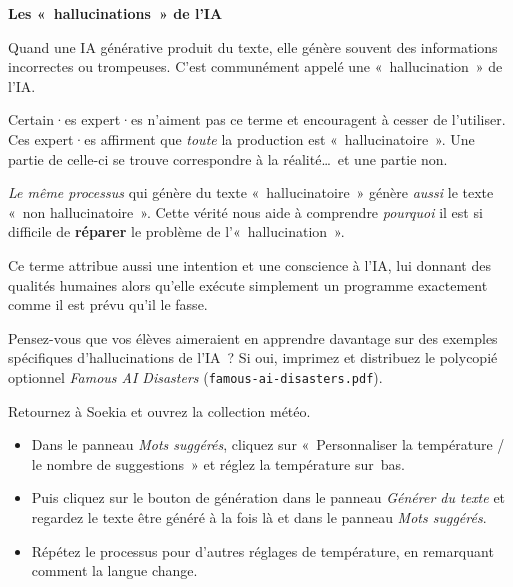 \documentclass[12pt,a4paper]{article}
\begin{document}
\begin{keypointbox}
  \textbf{Les «~hallucinations~» de l'IA}

  Quand une IA générative produit du texte, elle génère souvent des informations incorrectes ou trompeuses. C'est communément appelé une «~hallucination~» de l'IA.

  Certain·es expert·es n'aiment pas ce terme et encouragent à cesser de l'utiliser. Ces expert·es affirment que \emph{toute} la production est «~hallucinatoire~». Une partie de celle-ci se trouve correspondre à la réalité…~et une partie non.

  \vspace{0.3em}
  \emph{Le même processus} qui génère du texte «~hallucinatoire~» génère \emph{aussi} le texte «~non hallucinatoire~». Cette vérité nous aide à comprendre \emph{pourquoi} il est si difficile de \textbf{réparer} le problème de l'«~hallucination~».

  \vspace{0.3em}
  Ce terme attribue aussi une intention et une conscience à l'IA, lui donnant des qualités humaines alors qu'elle exécute simplement un programme exactement comme il est prévu qu'il le fasse.
\end{keypointbox}

\begin{instructornotes}
  Pensez-vous que vos élèves aimeraient en apprendre davantage sur des exemples spécifiques d'hallucinations de l'IA~? Si oui, imprimez et distribuez le polycopié optionnel \emph{Famous AI Disasters} (\texttt{famous-ai-disasters.pdf}).
\end{instructornotes}

\begin{activitybox}
  Retournez à Soekia et ouvrez la collection météo.
  \begin{itemize}
    \item Dans le panneau \emph{Mots suggérés}, cliquez sur «~Personnaliser la température / le nombre de suggestions~» et réglez la température sur~bas.
    \item Puis cliquez sur le bouton de génération dans le panneau \emph{Générer du texte} et regardez le texte être généré à la fois là et dans le panneau \emph{Mots suggérés}.
    \item Répétez le processus pour d'autres réglages de température, en remarquant comment la langue change.
  \end{itemize}
\end{activitybox}
\end{document}

